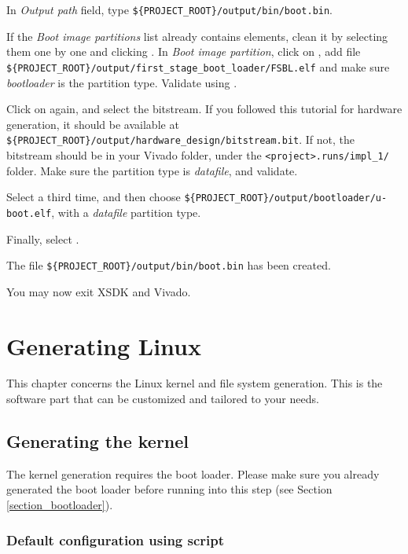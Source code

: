 \documentclass[openany,a4paper]{book}
\begin{document}
In \textit{Output path} field, type \nolinkurl{${PROJECT_ROOT}/output/bin/boot.bin}.

If the \textit{Boot image partitions} list already contains elements, clean it by selecting them one by one and clicking .
In \textit{Boot image partition}, click on , add file \nolinkurl{${PROJECT_ROOT}/output/first_stage_boot_loader/FSBL.elf} and make sure \textit{bootloader} is the partition type.
Validate using .

Click on  again, and select the bitstream.
If you followed this tutorial for hardware generation, it should be available at \nolinkurl{${PROJECT_ROOT}/output/hardware_design/bitstream.bit}.
If not, the bitstream should be in your Vivado folder, under the \nolinkurl{<project>.runs/impl_1/} folder.
Make sure the partition type is \textit{datafile}, and validate.

Select  a third time, and then choose \nolinkurl{${PROJECT_ROOT}/output/bootloader/u-boot.elf}, with a \textit{datafile} partition type.

Finally, select .

The file \nolinkurl{${PROJECT_ROOT}/output/bin/boot.bin} has been created.

You may now exit XSDK and Vivado.


\chapter{Generating Linux}

This chapter concerns the Linux kernel and file system generation.
This is the software part that can be customized and tailored to your needs.

\section{Generating the kernel}\label{section_linux_kernel}

The kernel generation requires the boot loader.
Please make sure you already generated the boot loader before running into this step (see Section \ref{section_bootloader}).

\subsection{Default configuration using script}
\end{document}
